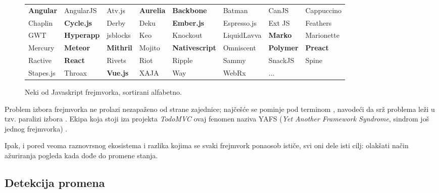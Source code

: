 \begin{figure}[tbh]
  \scriptsize
  \begin{center}
    \begin{tabularx}{\textwidth}{@{}llllllll@{}}

      \textbf{Angular} &
      AngularJS &
      Atv.js &
      \textbf{Aurelia} &
      \textbf{Backbone} &
      Batman &
      CanJS &
      Cappuccino \\
      Chaplin &
      \textbf{Cycle.js} &
      Derby &
      Deku &
      \textbf{Ember.js} &
      Espresso.js &
      Ext JS &
      Feathers \\
      GWT &
      \textbf{Hyperapp} &
      jsblocks &
      Keo &
      Knockout &
      LiquidLavva &
      \textbf{Marko} &
      Marionette \\
      Mercury &
      \textbf{Meteor} &
      \textbf{Mithril} &
      Mojito &
      \textbf{Nativescript} &
      Omniscent &
      \textbf{Polymer} &
      \textbf{Preact} \\
      Ractive &
      \textbf{React} &
      Rivets &
      Riot &
      Ripple &
      Sammy &
      SnackJS &
      Spine \\
      Stapes.js &
      Throax &
      \textbf{Vue.js} &
      XAJA &
      Way &
      WebRx &
      ... &
    \end{tabularx}
    \caption{Neki od Javaskript frejmvorka, sortirani alfabetno.}
    \label{fig:frameworks}
  \end{center}
\end{figure}

Problem izbora frejmvorka ne prolazi nezapaženo od strane zajednice; najčešće se pominje pod terminom , navodeći da srž problema leži u tzv. paralizi izbora \cite{teropa:overcoming-javascript-framework-fatigue, auth0:fatigue, addy:choice-paralysis}.
Ekipa koja stoji iza projekta \textsl{TodoMVC} ovaj fenomen naziva YAFS (\textsl{Yet Another Framework Syndrome}, sindrom još jednog frejmvorka) \cite{tastejs:yafs}.

Ipak, i pored veoma raznovrsnog ekosistema i razlika kojima se svaki frejmvork ponaosob ističe, svi oni dele isti cilj: olakšati način ažuriranja pogleda kada dođe do promene stanja.

\subsection{Detekcija promena}

